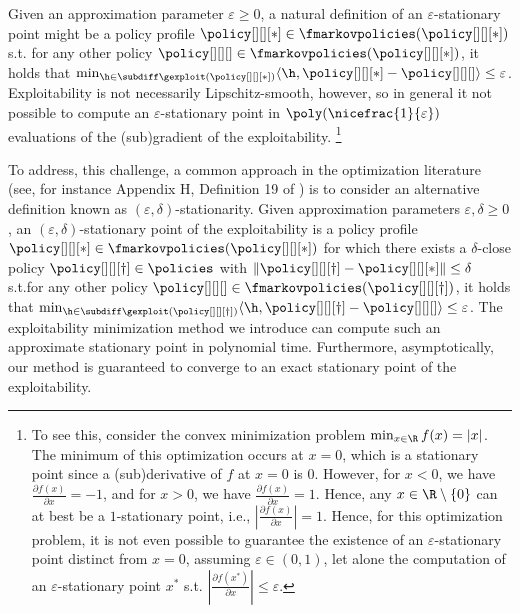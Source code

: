 Given an approximation parameter $\varepsilon \geq 0$, a natural definition of an $\varepsilon$-stationary point might be a policy profile $\policy[][][*] \in \fmarkovpolicies(\policy[][][*])$ s.t. for any other policy $\policy[][][] \in \fmarkovpolicies(\policy[][][*])$, it holds that $\min_{\h\in \subdiff \gexploit(\policy[][][*])} \langle \h, \policy[][][*] - \policy[][][] \rangle \leq \varepsilon$.
Exploitability is not necessarily Lipschitz-smooth, however, so in general it  not  possible 
  
to compute an $\varepsilon$-stationary point in $\poly(\nicefrac{1}{\varepsilon})$ evaluations of the (sub)gradient of the exploitability.%
\footnote{To see this, consider the convex minimization problem $\min_{x \in \R} f(x) = |x|$. 
The minimum of this optimization occurs at $x = 0$, which is a stationary point since a (sub)derivative of $f$ at $x= 0$ is $0$. 
However, for $x< 0$, we have $\frac{\partial f(x)}{\partial x} = -1$, and for $x> 0$, we have $\frac{\partial f(x)}{\partial x} = 1$. 
Hence, any $x \in \R \setminus \{ 0 \}$ can at best be a $1$-stationary point, i.e., $\left| \frac{\partial f(x)}{\partial x} \right| = 1$. 
Hence, for this optimization problem, it is not even possible to guarantee the existence of an $\varepsilon$-stationary point distinct from $x= 0$, assuming $\varepsilon \in (0, 1)$, let alone the computation of an $\varepsilon$-stationary point $x^*$ s.t. $\left| \frac{\partial f(x^*)}{\partial x} \right| \leq \varepsilon$.}

To address, this challenge, a common approach in the optimization literature (see, for instance Appendix H, Definition 19 of \citet{liu_first-order_2021}) is to consider an alternative definition known as $(\varepsilon, \delta)$-stationarity. 
Given approximation parameters $\varepsilon, \delta \geq 0$, an $(\varepsilon, \delta)$-stationary point of the exploitability is a policy profile  $\policy[][][*] \in \fmarkovpolicies(\policy[][][*])$ for which there exists a $\delta$-close policy $\policy[][][\dagger] \in \policies$ with $\| \policy[][][\dagger] - \policy[][][*]\| \leq \delta$ s.t.\@ for any other policy $\policy[][][] \in \fmarkovpolicies(\policy[][][\dagger])$, it holds that $\min_{\h\in \subdiff \gexploit(\policy[][][\dagger])} \langle \h, \policy[][][\dagger] - \policy[][][] \rangle \leq \varepsilon$. 
The exploitability minimization method we introduce can compute such an approximate stationary point in polynomial time.
Furthermore, asymptotically, our method is guaranteed to converge to an exact stationary point of the exploitability.

